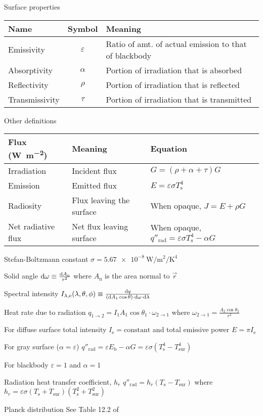 \documentclass{article}
\begin{document}
\begin{description*}
  \item[Surface properties]
    \begin{tabu}{lcl}
      \toprule
      Name & Symbol & Meaning \\
      \midrule
      Emissivity & $\varepsilon$ & Ratio of amt. of actual emission to that of blackbody \\
      Absorptivity & $\alpha$ & Portion of irradiation that is absorbed \\
      Reflectivity & $\rho$ & Portion of irradiation that is reflected \\
      Transmissivity & $\tau$ & Portion of irradiation that is transmitted \\
      \bottomrule
    \end{tabu}
  \item[Other definitions]
    \begin{tabu}{lll}
      \toprule
      Flux (\si{\watt\per\square\meter}) & Meaning & Equation \\
      \midrule
      Irradiation & Incident flux & \(G = (\rho+\alpha+\tau)G\) \\
      Emission & Emitted flux & \(E = \varepsilon\sigma{}T^4_\mathrm{s}\) \\
      Radiosity & Flux leaving the surface & When opaque, \(J = E + \rho{}G\)\\
      Net radiative flux & Net flux leaving surface & When opaque,
      \(q''_\mathrm{rad} = \varepsilon\sigma{}T^4_\mathrm{s}-\alpha{}G\) \\
      \bottomrule
    \end{tabu}
  \item[Stefan-Boltzmann constant]
    \(\sigma = \SI{5.67e-8}{\watt\per\square\meter\per\kelvin\tothe{4}}\)
  \item[Solid angle]
    \(\dif{\omega} \equiv \frac{\dif{A_\mathrm{n}}}{r^2}\) where
    $A_\mathrm{n}$ is the area normal to $\vec{r}$
  \item[Spectral intensity]
    \(I_{\lambda,\mathrm{e}}(\lambda,\theta,\phi)
    \equiv \frac{\dif q}{(\dif{A_1}\cos\theta)\cdot\dif{\omega}\cdot\dif{\lambda}}\)
  \item[Heat rate due to radiation]
    \(q_{1\rightarrow2} = I_1A_1\cos\theta_1 \cdot \omega_{2\rightarrow1}\) where
    \(\omega_{2\rightarrow1} = \frac{A_2\cos\theta_2}{r^2}\)
  \item[For diffuse surface]
    total intensity \(I_\mathrm{e} = \textrm{constant}\) and
    total emissive power \(E = \pi{}I_\mathrm{e}\)
  \item[For gray surface ($\alpha=\varepsilon$)]
    \(q''_\mathrm{rad} = \varepsilon E_\mathrm{b} - \alpha G
    = \varepsilon\sigma(T_\mathrm{s}^4-T_\mathrm{sur}^4)\)
  \item[For blackbody] $\varepsilon=1$ and $\alpha=1$
  \item[Radiation heat transfer coefficient, $h_r$]
    \(q''_\mathrm{rad} = h_r(T_\mathrm{s}-T_\mathrm{sur})\) where
    \(h_r = \varepsilon\sigma(T_\mathrm{s}+T_\mathrm{sur})(T_\mathrm{s}^2+T_\mathrm{sur}^2)\)
  \item[Planck distribution] See Table 12.2 of \cite{hamt}
\end{description*}
\end{document}
